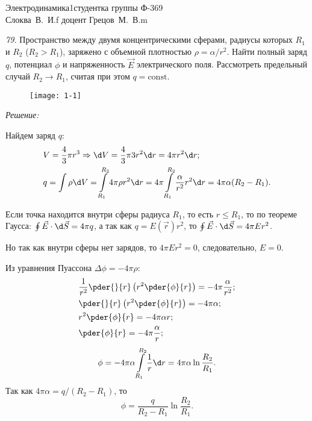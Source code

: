 




{Электродинамика}{1}{}{студентка группы Ф-369\\Слоква~В.~И.}{f}
{доцент Грецов~М.~В.}{m}

\renewcommand{\labelenumi}{\asbuk{enumi})}
\renewcommand{\v}{\mathrm{v}}

\newpage
\emph{79.} Пространство между двумя концентрическими сферами, радиусы которых
\( R_1 \) и \( R_2 \) (\( R_2 > R_1 \)), заряжено с объемной плотностью
\( \rho = \alpha/r^2 \). Найти полный заряд \( q \), потенциал \( \phi \) и
напряженность \( \vec{E} \) электрического поля. Рассмотреть предельный случай
\( R_2 \to R_1 \), считая при этом \( q = \mathrm{const} \).

\vspace*{2em}
\begin{figure}[h!]
    \center
    \texttt{[image: 1-1]}
\end{figure}
\emph{Решение:}

Найдем заряд \( q \):
\begin{align*}
    & V = \frac{4}{3}\pi r^3 \Rightarrow \d V = \frac{4}{3}\pi 3r^2\d r =
    4\pi r^2\d r; \\
    & q = \int\rho\d V = \int\limits_{R_1}^{R_2} 4\pi\rho r^2\d r = 4\pi \int
    \limits_{R_1}^{R_2} \frac{\alpha}{r^2} r^2\d r = 4\pi\alpha (R_2 - R_1).
\end{align*}

Если точка находится внутри сферы радиуса \( R_1 \), то есть \( r \le R_1 \), то
по теореме Гаусса: \( \oint \vec{E}\cdot\d\vec{S} = 4\pi q \), а так как
\( q = E(\vec{r})r^2 \), то \( \oint \vec{E}\cdot\d\vec{S} = 4\pi E r^2 \).

Но так как внутри сферы нет зарядов, то \( 4\pi E r^2 = 0 \), следовательно,
\( E = 0 \).

Из уравнения Пуассона \( \Delta\phi = -4\pi\rho \):
\begin{align*}
    & \frac{1}{r^2} \pder{}{r}\left(r^2\pder{\phi}{r}\right) =
    -4\pi\frac{\alpha}{r^2}; \\
    & \pder{}{r}\left(r^2\pder{\phi}{r}\right) = -4\pi\alpha; \\
    & r^2 \pder{\phi}{r} = -4\pi\alpha r; \\
    & \pder{\phi}{r} = -4\pi\frac{\alpha}{r};
\end{align*}
\[
    \phi = -4\pi\alpha\int\limits_{R_1}^{R_2} \frac{1}{r}\d r =
    4\pi\alpha\ln\frac{R_2}{R_1}.    
\]
Так как \( 4\pi\alpha = q/(R_2 - R_1) \), то
\[
    \phi = \frac{q}{R_2 - R_1}\ln\frac{R_2}{R_1}.
\]

